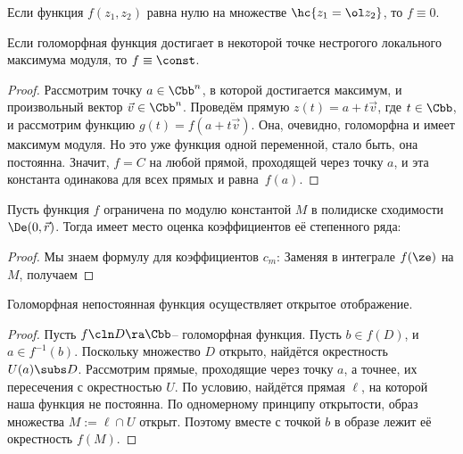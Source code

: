 \documentclass[a4paper]{article}
\DeclareMathOperator{\Sk}{Sk}
\begin{document}
\begin{problem}
Если функция $f(z_1,z_2)$ равна нулю на множестве $\hc{z_1 = \ol z_2}$, то $f \equiv 0$.
\end{problem}


\begin{theorem}
Если голоморфная функция достигает в некоторой точке нестрогого локального максимума модуля,
то $f\equiv\const$.
\end{theorem}
\begin{proof}
Рассмотрим точку $a\in \Cbb^n$, в которой достигается максимум, и произвольный вектор
$\vec v\in \Cbb^n$. Проведём прямую $z(t) = a+t\vec v$, где $t\in\Cbb$, и рассмотрим
функцию $g(t)=f(a+t\vec v)$. Она, очевидно, голоморфна и имеет максимум модуля.
Но это уже функция одной переменной, стало быть, она постоянна. Значит, $f=C$
на любой прямой, проходящей через точку $a$, и эта константа одинакова для всех прямых
и равна~$f(a)$.
\end{proof}

\begin{theorem}
Пусть функция $f$ ограничена по модулю константой $M$ в полидиске сходимости $\De(0,\vec r)$.
Тогда имеет место оценка коэффициентов её степенного ряда:
\end{theorem}
\begin{proof}
Мы знаем формулу для коэффициентов $c_m$:
\eqn{c_m = \frac{1}{(2\pi i)^n}\ints{\Sk \De} \frac{f(\ze)\,d\ze}{\prod(\ze_j-a_j)^{m_j+1}}.}
Заменяя в интеграле $f(\ze)$ на $M$, получаем
\hfill\end{proof}

\begin{theorem}
Голоморфная непостоянная функция осуществляет открытое отображение.
\end{theorem}
\begin{proof}
Пусть $f\cln D \ra \Cbb$-- голоморфная функция.
Пусть $b \in f(D)$, и $a \in f^{-1}(b)$. Поскольку множество $D$ открыто, найдётся окрестность $U(a) \subs D$.
Рассмотрим прямые, проходящие через точку $a$, а точнее, их пересечения с окрестностью $U$.
По условию, найдётся прямая $\ell$, на которой наша функция не постоянна. По одномерному принципу открытости,
образ множества $M := \ell \cap U$ открыт. Поэтому вместе с точкой $b$ в образе лежит её окрестность $f(M)$.
\end{proof}
\end{document}
